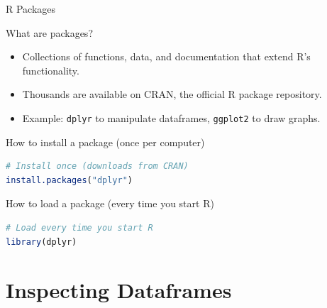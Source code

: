 \documentclass[9pt,aspectratio=169]{beamer}
\begin{document}
\begin{frame}[fragile]{R Packages}
\linespread{1.3}\selectfont %

\begin{block}{What are packages?}
\begin{itemize}
  \item Collections of functions, data, and documentation that extend R’s functionality.
  \item Thousands are available on CRAN, the official R package repository.
  \item Example: \texttt{dplyr} to manipulate dataframes, \texttt{ggplot2} to draw graphs.
\end{itemize}
\end{block}

\begin{block}{How to install a package (once per computer)}
\begin{lstlisting}[language=R, basicstyle=\ttfamily\small, frame=single]
# Install once (downloads from CRAN)
install.packages("dplyr")
\end{lstlisting}
\end{block}

\begin{block}{How to load a package (every time you start R)}
\begin{lstlisting}[language=R, basicstyle=\ttfamily\small, frame=single]
# Load every time you start R
library(dplyr)
\end{lstlisting}
\end{block}

\end{frame}


\section{Inspecting Dataframes}
\end{document}

